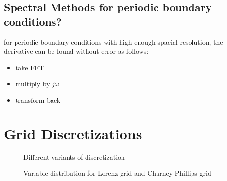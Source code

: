 \subsection{Spectral Methods for periodic boundary conditions?}
for periodic boundary conditions with high enough spacial resolution, the derivative can be found without error as follows:
\begin{itemize}
\item take FFT
\item multiply by $j\omega$
\item transform back
\end{itemize}


\section{Grid Discretizations}
\begin{figure}[ht]
    \caption{Different variants of discretization}
    \label{fig:grid_discretization}
\end{figure}
\begin{figure}[ht]
    \caption{Variable distribution for Lorenz grid and Charney-Phillips grid}
    \label{fig:lorenz_cp}
\end{figure}
